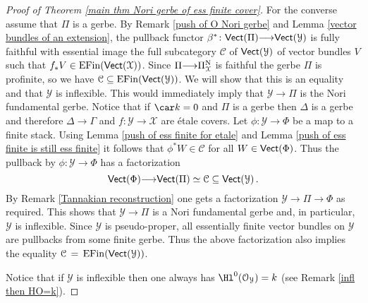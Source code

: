 \documentclass[12pt,reqno]{amsart}
\theoremstyle{plain}
\theoremstyle{definition}
\numberwithin{thm}{section}
\newcounter{x}\setcounter{x}{1}
\theoremstyle{plain}
\begin{document}
\begin{proof}[Proof of Theorem \ref{main thm Nori gerbe of ess finite cover}]
For the converse assume that $\Pi$ is a gerbe. By Remark \ref{push of O Nori gerbe} and
Lemma \ref{vector bundles of an extension}, the pullback functor $\beta^*\colon {\text{\sf Vect}}(\Pi){\longrightarrow} {\text{\sf Vect}}({\mathcal{Y}})$ is fully faithful with essential image the full subcategory ${\mathcal{C}}$ of ${\text{\sf Vect}}({\mathcal{Y}})$ of vector bundles $V$ such that $f_*V\in{{\rm EFin}}({\text{\sf Vect}}({\mathcal{X}}))$.
Since $\Pi{\longrightarrow} \Pi^{\textup{N}}_{\mathcal{X}}$ is faithful the gerbe $\Pi$ is profinite, so
we have ${\mathcal{C}}\subseteq {{\rm EFin}}({\text{\sf Vect}}({\mathcal{Y}}))$.
We will show that this is an equality and that ${\mathcal{Y}}$ is inflexible. This
would immediately imply that ${\mathcal{Y}}{\longrightarrow} \Pi$ is the Nori fundamental gerbe. Notice that if $\car k = 0$ and $\Pi$ is a gerbe then $\Delta$ is a gerbe and therefore $\Delta{\longrightarrow} \Gamma$ and $f\colon {\mathcal{Y}}{\longrightarrow} {\mathcal{X}}$ are \'etale covers.
Let $\phi\colon {\mathcal{Y}}{\longrightarrow} \Phi$ be a map to a finite stack. Using
Lemma \ref{push of ess finite for etale} and Lemma \ref{push of ess finite is still ess finite} it
follows that $\phi^*W \in {\mathcal{C}}$ for all $W\in {\text{\sf Vect}}(\Phi)$. Thus the pullback
by $\phi\colon {\mathcal{Y}} {\longrightarrow} \Phi$ has a factorization
\[
{\text{\sf Vect}}(\Phi) {\longrightarrow} {\text{\sf Vect}}(\Pi) \simeq {\mathcal{C}} \subseteq {\text{\sf Vect}}({\mathcal{Y}})\, .
\]
By Remark \ref{Tannakian reconstruction} one gets a factorization ${\mathcal{Y}}{\longrightarrow} \Pi {\longrightarrow} \Phi$ as
required. This shows that ${\mathcal{Y}}{\longrightarrow} \Pi$ is a Nori fundamental gerbe and, in particular, ${\mathcal{Y}}$
is inflexible. Since ${\mathcal{Y}}$ is pseudo-proper, all essentially finite vector bundles on ${\mathcal{Y}}$ are
pullbacks from some finite gerbe. Thus the above factorization also implies the equality
${\mathcal{C}}\,=\,{{\rm EFin}}({\text{\sf Vect}}({\mathcal{Y}}))$.

Notice that if ${\mathcal{Y}}$ is inflexible then one always has $\Hl^0({\mathcal{O}_{\mathcal{Y}}})=k$ (see
Remark \ref{infl then HO=k}).


\end{proof}
\end{document}
